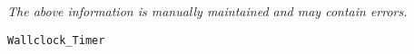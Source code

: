 \label{pkg:wallclock\_timer}

{\tiny \it The above information is manually maintained and may contain errors.}
\begin{verbatim}
Wallclock_Timer
\end{verbatim}
